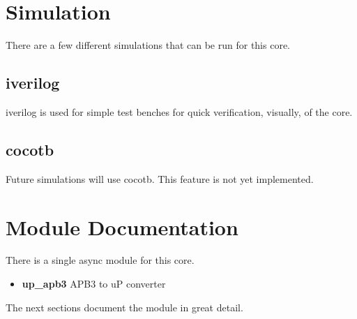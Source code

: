 \newpage

\section{Simulation}
\par
There are a few different simulations that can be run for this core.

\subsection{iverilog}
\par
iverilog is used for simple test benches for quick verification, visually, of the core.

\subsection{cocotb}
\par
Future simulations will use cocotb. This feature is not yet implemented.

\newpage

\section{Module Documentation} \label{Module Documentation}

\par
There is a single async module for this core.

\begin{itemize}
\item \textbf{up\_apb3} APB3 to uP converter\\
\end{itemize}
The next sections document the module in great detail.

